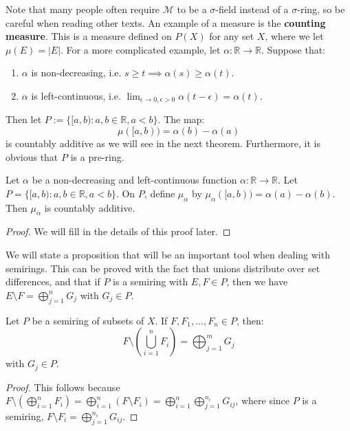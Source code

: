 	Note that many people often require $\mathcal M$ to be a $\sigma$-field instead of a $\sigma$-ring, so be careful when 
	reading other texts. An example of a measure is the \textbf{counting measure}. This is a measure defined on $P(X)$ for 
	any set $X$, where we let $\mu(E) = |E|$. For a more complicated example, let $\alpha : \mathbb R\rightarrow \mathbb 
	R$. Suppose that:
	\begin{enumerate}
		\item $\alpha$ is non-decreasing, i.e. $s\geq t\implies\alpha(s)\geq\alpha(t)$.
		\item $\alpha$ is left-continuous, i.e. $\lim_{\epsilon\rightarrow 0, \epsilon > 0}\alpha(t - \epsilon) = \alpha(t)$. 
	\end{enumerate}
	Then let $P := \{[a, b) : a, b\in\mathbb R, a < b\}$. The map:
	$$
		\mu([a, b)) = \alpha(b) - \alpha(a)
	$$
	is countably additive as we will see in the next theorem. Furthermore, it is obvious that $P$ is a pre-ring.
	
	\begin{theorem}
		Let $\alpha$ be a non-decreasing and left-continuous function $\alpha : \mathbb R\rightarrow\mathbb R$. Let $P = 
		\{[a, b) : a, b\in\mathbb R, a < b\}$. On $P$, define $\mu_\alpha$ by $\mu_\alpha([a, b)) = \alpha(a) - \alpha(b)$. 
		Then $\mu_\alpha$ is countably additive.
	\end{theorem}
	
	\begin{proof}
		We will fill in the details of this proof later.
	\end{proof}
	
	We will state a proposition that will be an important tool when dealing with semirings. This can be proved with the fact 
	that unions distribute over set differences, and that if $P$ is a semiring with $E, F\in P$, then we have 
	$E\setminus F = \bigoplus_{j = 1}^n G_j$ with $G_j\in P$.
	
	\begin{prop}
		Let $P$ be a semiring of subsets of $X$. If $F, F_1, ..., F_n\in P$, then:
		$$
			F\setminus \left(\bigcup_{i = 1}^n F_i \right) = \bigoplus_{j = 1}^m G_j
		$$
		with $G_j\in P$. 
	\end{prop}
	
	\begin{proof}
		This follows because $F\setminus (\bigoplus_{i = 1}^n F_i) = \bigoplus_{i = 1}^n (F\setminus F_i) = 
		\bigoplus_{i = 1}^n\bigoplus_{j = 1}^{n_i} G_{ij}$, where since $P$ is a semiring, $F\setminus F_i = 
		\bigoplus_{j = 1}^{n_i} G_{ij}$.
	\end{proof}
	
